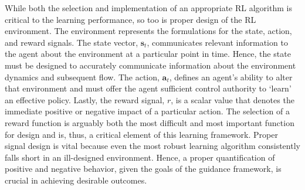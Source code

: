 \documentclass[conference]{IEEEtran}
\begin{document}
While both the selection and implementation of an appropriate RL algorithm is critical to the learning performance, so too is proper design of the RL environment. The environment represents the formulations for the state, action, and reward signals. The state vector, \(\boldsymbol{s}_t\), communicates relevant information to the agent about the environment at a particular point in time. Hence, the state must be designed to accurately communicate information about the environment dynamics and subsequent flow. The action, \(\boldsymbol{a}_t\), defines an agent's ability to alter that environment and must offer the agent sufficient control authority to `learn' an effective policy. Lastly, the reward signal, \(r\), is a scalar value that denotes the immediate positive or negative impact of a particular action. The selection of a reward function is arguably both the most difficult and most important function for design and is, thus, a critical element of this learning framework. Proper signal design is vital because even the most robust learning algorithm consistently falls short in an ill-designed environment. Hence, a proper quantification of positive and negative behavior, given the goals of the guidance framework, is crucial in achieving desirable outcomes.
\end{document}
